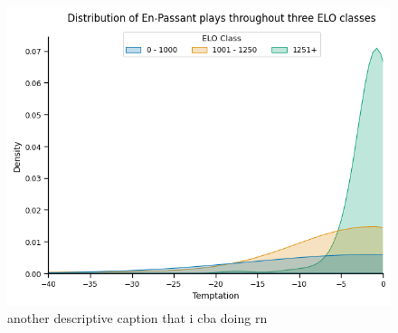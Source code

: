 \documentclass[10pt,a4paper,twocolumn]{article}
\begin{document}
\begin{figure}[t]
  \centering
  \includegraphics{report/images/ep_distplo_alt.png}
  \caption{another descriptive caption that i cba doing rn}
  \label{fds-project-template:fig:ep_distplot}
\end{figure}


\end{document}
